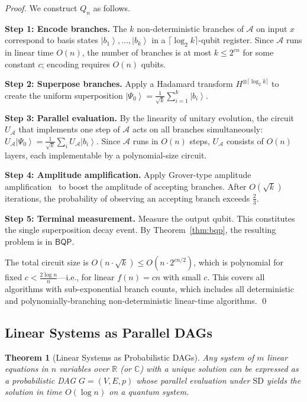 \documentclass[12pt, a4paper]{article}
\theoremstyle{plain}
\newtheorem{theorem}{Theorem}[section]
\theoremstyle{definition}
\theoremstyle{remark}
\newcommand{\ket}[1]{\left| #1 \right\rangle}
\newcommand{\bqp}{\ensuremath{\mathsf{BQP}}}
\newcommand{\SD}{\ensuremath{\mathrm{SD}}}   %
\newcommand{\Real}{\mathbb{R}}
\newcommand{\Complex}{\mathbb{C}}
\begin{document}
\begin{proof}
  We construct $Q_n$ as follows.

  \textbf{Step 1: Encode branches.}  The $k$ non-deterministic branches of
  $\mathcal{A}$ on input $x$ correspond to basis states $\ket{b_1}, \ldots,
  \ket{b_k}$ in a $\lceil \log_2 k \rceil$-qubit register.  Since
  $\mathcal{A}$ runs in linear time $O(n)$, the number of branches is at most
  $k \leq 2^{cn}$ for some constant $c$; encoding requires $O(n)$ qubits.

  \textbf{Step 2: Superpose branches.}  Apply a Hadamard transform $H^{\otimes
  \lceil \log_2 k \rceil}$ to create the uniform superposition
  $\ket{\Psi_0} = \frac{1}{\sqrt{k}} \sum_{i=1}^k \ket{b_i}$.

  \textbf{Step 3: Parallel evaluation.}  By the linearity of unitary
  evolution, the circuit $U_{\mathcal{A}}$ that implements one step of
  $\mathcal{A}$ acts on all branches simultaneously:
  $U_{\mathcal{A}} \ket{\Psi_0} = \frac{1}{\sqrt{k}} \sum_i U_{\mathcal{A}}
  \ket{b_i}$.  Since $\mathcal{A}$ runs in $O(n)$ steps, $U_{\mathcal{A}}$
  consists of $O(n)$ layers, each implementable by a polynomial-size circuit.

  \textbf{Step 4: Amplitude amplification.}  Apply Grover-type amplitude
  amplification~\cite{grover1996} to boost the amplitude of accepting branches.
  After $O(\sqrt{k})$ iterations, the probability of observing an accepting
  branch exceeds $\tfrac{2}{3}$.

  \textbf{Step 5: Terminal measurement.}  Measure the output qubit.  This
  constitutes the single superposition decay event.  By
  Theorem~\ref{thm:bqp}, the resulting problem is in $\bqp$.

  The total circuit size is $O(n \cdot \sqrt{k}) \leq O(n \cdot 2^{cn/2})$,
  which is polynomial for fixed $c < \tfrac{2 \log n}{n}$---i.e., for linear
  $f(n) = cn$ with small $c$.  This covers all algorithms with sub-exponential
  branch counts, which includes all deterministic and polynomially-branching
  non-deterministic linear-time algorithms. \qed
\end{proof}

\subsection{Linear Systems as Parallel DAGs}

\begin{theorem}[Linear Systems as Probabilistic DAGs]
  \label{thm:dag}
  Any system of $m$ linear equations in $n$ variables over $\Real$ (or
  $\Complex$) with a unique solution can be expressed as a probabilistic DAG
  $G = (V, E, p)$ whose parallel evaluation under \SD{} yields the solution
  in time $O(\log n)$ on a quantum system.
\end{theorem}
\end{document}
